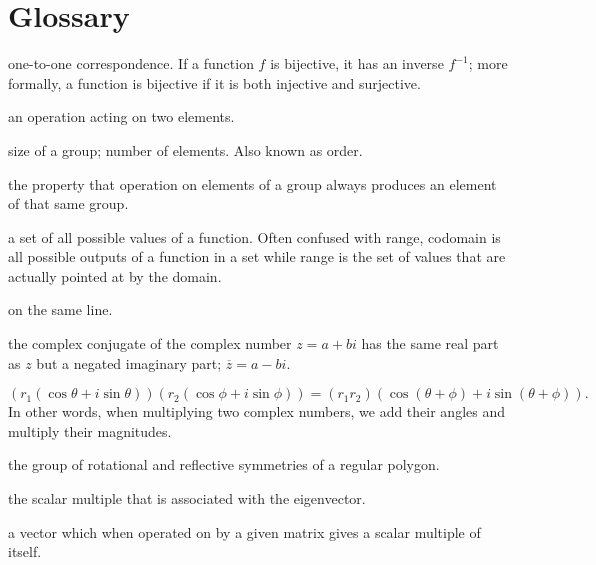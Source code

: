 \documentclass[../gatm.tex]{subfiles}
\begin{document}
\section{Glossary}
\setcounter{problem_i}{0}

\begin{description}[align=left]

\item[bijection] one-to-one correspondence. If a function $f$ is bijective, it has an inverse $f^{-1}$; more formally, a function is bijective if it is both injective and surjective.

\item[binary operation] an operation acting on two elements.

\item[cardinality] size of a group; number of elements. Also known as order.

\item[closure] the property that operation on elements of a group always produces an element of that same group.

\item[codomain] a set of all possible values of a function. Often confused with range, codomain is all possible outputs of a function in a set while range is the set of values that are actually pointed at by the domain.

\item[collinear] on the same line.

\item[complex conjugate] the complex conjugate of the complex number $z=a+bi$ has the same real part as $z$ but a negated imaginary part; $\overline{z}=a-bi$.

\item[DeMoivre's theorem] $$(r_1 (\cos \theta + i \sin \theta)) (r_2 (\cos \phi + i \sin \phi)) = (r_1r_2) (\cos(\theta + \phi) + i \sin(\theta + \phi)).$$ In other words, when multiplying two complex numbers, we add their angles and multiply their magnitudes.

\item[dihedral group] the group of rotational and reflective symmetries of a regular polygon.

\item[eigenvalue] the scalar multiple that is associated with the eigenvector.

\item[eigenvector] a vector which when operated on by a given matrix gives a scalar multiple of itself.


\end{description}
\end{document}
